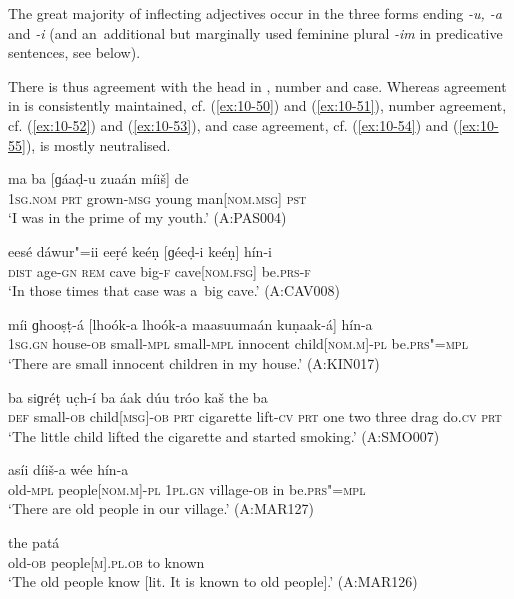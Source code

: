 The great majority of inflecting adjectives occur in the three forms ending \textit{-u, -a} and \textit{-i} (and an~additional but marginally used feminine plural \textit{-im} in predicative sentences, see  below).


There is thus agreement with the  head in , number and case. Whereas agreement in  is consistently maintained, cf. (\ref{ex:10-50}) and (\ref{ex:10-51}), number agreement, cf. (\ref{ex:10-52}) and (\ref{ex:10-53}), and case agreement, cf. (\ref{ex:10-54}) and (\ref{ex:10-55}), is mostly neutralised. 

\begin{exe}
\ex
\label{ex:10-50}
\gll ma ba [ɡáaḍ-u zuaán míiš] de \\
\textsc{1sg.nom} \textsc{prt} grown-\textsc{msg} young man[\textsc{nom}.\textsc{msg}] \textsc{pst} \\
\glt `I was in the prime of my youth.' (A:PAS004)

\ex
\label{ex:10-51}
\gll eesé dáwur"=ii eeṛé keéṇ [ɡéeḍ-i keéṇ] hín-i \\
\textsc{dist} age-\textsc{gn} \textsc{rem} cave big-\textsc{f} cave[\textsc{nom}.\textsc{fsg}] be.\textsc{prs-f} \\
\glt `In those times that case was a~big cave.' (A:CAV008)

\ex
\label{ex:10-52}
\gll míi ɡhooṣṭ-á [lhoók-a lhoók-a maasuumaán kuṇaak-á] hín-a \\
\textsc{1sg.gn} house-\textsc{ob} small-\textsc{mpl} small-\textsc{mpl}  innocent child[\textsc{nom.m}]-\textsc{pl} be.\textsc{prs"=mpl}\\
\glt `There are small innocent children in my house.' (A:KIN017)

\ex
\label{ex:10-53}
 ba siɡréṭ uc̣h-í ba áak dúu tróo kaš the ba \\
\textsc{def} small-\textsc{ob} child[\textsc{msg}]-\textsc{ob} \textsc{prt} cigarette lift-\textsc{cv} \textsc{prt } one two three drag do.\textsc{cv} \textsc{prt}  \\
\glt `The little child lifted the cigarette and started smoking.' (A:SMO007)

\ex
\label{ex:10-54}
 asíi díiš-a wée hín-a \\
old-\textsc{mpl} people[\textsc{nom.m}]-\textsc{pl} \textsc{1pl.gn} village-\textsc{ob} in be.\textsc{prs"=mpl} \\
\glt `There are old people in our village.' (A:MAR127)

\ex
\label{ex:10-55}
 the patá \\
old-\textsc{ob} people[\textsc{m}].\textsc{pl.ob} to known \\
\glt `The old people know [lit. It is known to old people].' (A:MAR126)
\end{exe}


